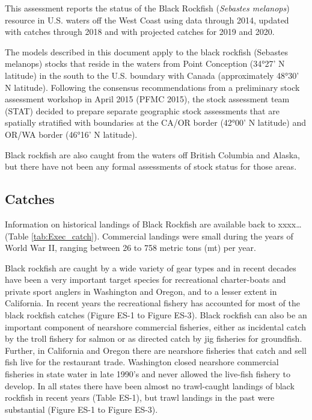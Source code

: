 \documentclass[12pt,]{article}
\begin{document}
This assessment reports the status of the Black Rockfish
(\emph{Sebastes melanops}) resource in U.S. waters off the West Coast
using data through 2014, updated with catches through 2018 and with
projected catches for 2019 and 2020.

The models described in this document apply to the black rockfish
(Sebastes melanops) stocks that reside in the waters from Point
Conception (34°27' N latitude) in the south to the U.S. boundary with
Canada (approximately 48°30' N latitude). Following the consensus
recommendations from a preliminary stock assessment workshop in April
2015 (PFMC 2015), the stock assessment team (STAT) decided to prepare
separate geographic stock assessments that are spatially stratified with
boundaries at the CA/OR border (42°00' N latitude) and OR/WA border
(46°16' N latitude).

Black rockfish are also caught from the waters off British Columbia and
Alaska, but there have not been any formal assessments of stock status
for those areas.

\subsection*{Catches}\label{catches}

Information on historical landings of Black Rockfish are available back
to xxxx\ldots{} (Table \ref{tab:Exec_catch}). Commercial landings were
small during the years of World War II, ranging between 26 to 758 metric
tons (mt) per year.

Black rockfish are caught by a wide variety of gear types and in recent
decades have been a very important target species for recreational
charter-boats and private sport anglers in Washington and Oregon, and to
a lesser extent in California. In recent years the recreational fishery
has accounted for most of the black rockfish catches (Figure ES-1 to
Figure ES-3). Black rockfish can also be an important component of
nearshore commercial fisheries, either as incidental catch by the troll
fishery for salmon or as directed catch by jig fisheries for groundfish.
Further, in California and Oregon there are nearshore fisheries that
catch and sell fish live for the restaurant trade. Washington closed
nearshore commercial fisheries in state water in late 1990's and never
allowed the live-fish fishery to develop. In all states there have been
almost no trawl-caught landings of black rockfish in recent years (Table
ES-1), but trawl landings in the past were substantial (Figure ES-1 to
Figure ES-3).
\end{document}
